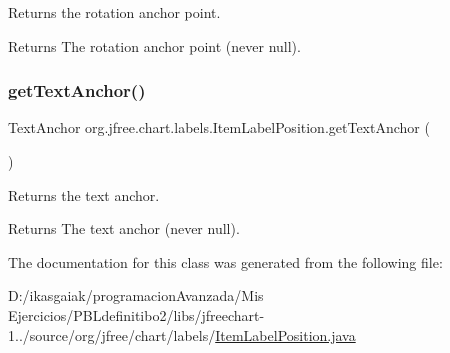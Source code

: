 Returns the rotation anchor point.

\begin{DoxyReturn}{Returns}
The rotation anchor point (never {\ttfamily null}). 
\end{DoxyReturn}
\mbox{\label{classorg_1_1jfree_1_1chart_1_1labels_1_1_item_label_position_a21bd3824fa0cf9d9d20a9b020f12b170}} 
\subsubsection{\texorpdfstring{get\+Text\+Anchor()}{getTextAnchor()}}
{\footnotesize\ttfamily Text\+Anchor org.\+jfree.\+chart.\+labels.\+Item\+Label\+Position.\+get\+Text\+Anchor (\begin{DoxyParamCaption}{ }\end{DoxyParamCaption})}

Returns the text anchor.

\begin{DoxyReturn}{Returns}
The text anchor (never {\ttfamily null}). 
\end{DoxyReturn}


The documentation for this class was generated from the following file\+:\begin{DoxyCompactItemize}
\item 
D\+:/ikasgaiak/programacion\+Avanzada/\+Mis Ejercicios/\+P\+B\+Ldefinitibo2/libs/jfreechart-\/1../source/org/jfree/chart/labels/\mbox{\hyperlink{_item_label_position_8java}{Item\+Label\+Position.\+java}}\end{DoxyCompactItemize}
